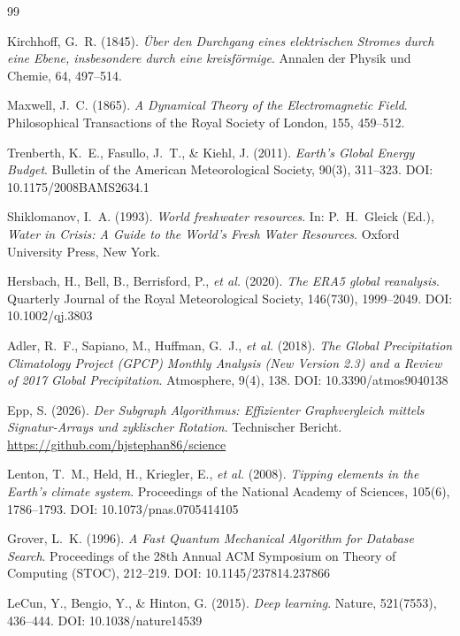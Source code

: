 ﻿\documentclass[a4paper,12pt]{article}
\theoremstyle{definition}
\begin{document}
\begin{thebibliography}{99}

Kirchhoff, G.~R. (1845).
\textit{Über den Durchgang eines elektrischen Stromes durch eine Ebene,
insbesondere durch eine kreisförmige}.
Annalen der Physik und Chemie, 64, 497--514.

Maxwell, J.~C. (1865).
\textit{A Dynamical Theory of the Electromagnetic Field}.
Philosophical Transactions of the Royal Society of London, 155, 459--512.

Trenberth, K.~E., Fasullo, J.~T., \& Kiehl, J. (2011).
\textit{Earth's Global Energy Budget}.
Bulletin of the American Meteorological Society, 90(3), 311--323.
DOI: 10.1175/2008BAMS2634.1

Shiklomanov, I.~A. (1993).
\textit{World freshwater resources}.
In: P.~H.~Gleick (Ed.), \textit{Water in Crisis: A Guide to the World's
Fresh Water Resources}. Oxford University Press, New York.

Hersbach, H., Bell, B., Berrisford, P., \textit{et al.} (2020).
\textit{The ERA5 global reanalysis}.
Quarterly Journal of the Royal Meteorological Society, 146(730), 1999--2049.
DOI: 10.1002/qj.3803

Adler, R.~F., Sapiano, M., Huffman, G.~J., \textit{et al.} (2018).
\textit{The Global Precipitation Climatology Project (GPCP) Monthly
Analysis (New Version 2.3) and a Review of 2017 Global Precipitation}.
Atmosphere, 9(4), 138.
DOI: 10.3390/atmos9040138

Epp, S. (2026).
\textit{Der Subgraph Algorithmus: Effizienter Graphvergleich mittels
Signatur-Arrays und zyklischer Rotation}.
Technischer Bericht.
\url{https://github.com/hjstephan86/science}

Lenton, T.~M., Held, H., Kriegler, E., \textit{et al.} (2008).
\textit{Tipping elements in the Earth's climate system}.
Proceedings of the National Academy of Sciences, 105(6), 1786--1793.
DOI: 10.1073/pnas.0705414105

Grover, L.~K. (1996).
\textit{A Fast Quantum Mechanical Algorithm for Database Search}.
Proceedings of the 28th Annual ACM Symposium on Theory of Computing
(STOC), 212--219.
DOI: 10.1145/237814.237866

LeCun, Y., Bengio, Y., \& Hinton, G. (2015).
\textit{Deep learning}.
Nature, 521(7553), 436--444.
DOI: 10.1038/nature14539


\end{thebibliography}
\end{document}
